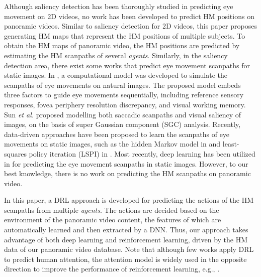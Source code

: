 \documentclass[10pt,journal,compsoc]{IEEEtran}
\begin{document}
Although saliency detection has been thoroughly studied in predicting eye movement on 2D videos, no work has been developed to predict HM positions on panoramic videos.
Similar to saliency detection for 2D videos, this paper proposes generating HM maps that represent the HM positions of multiple subjects.
To obtain the HM maps of panoramic video, the HM positions are predicted by estimating the HM scanpaths of several \textit{agents}. Similarly, in the saliency detection area, there exist some works \cite{Wang2011, Sun12, Liu_2013_ICCV, Jiang2016, Assens_2017_ICCV, Shao2017} that predict eye movement scanpaths for static images.
In \cite{Wang2011}, a computational model was developed to simulate the scanpaths of eye movements on natural images. The proposed model embeds three factors to guide eye movements sequentially, including reference sensory responses, fovea periphery resolution discrepancy, and visual working memory. Sun \textit{et al.} \cite{Sun12} proposed modelling both saccadic scanpaths and visual saliency of images, on the basis of super Gaussian component (SGC) analysis. Recently, data-driven approaches have been proposed to learn the scanpaths of eye movements on static images, such as the hidden Markov model in \cite{Liu_2013_ICCV} and least-squares policy iteration (LSPI) in \cite{Jiang2016}.
Most recently, deep learning has been utilized in \cite{Assens_2017_ICCV, Shao2017} for predicting the eye movement scanpaths in static images.
However, to our best knowledge, there is no work on predicting the HM scanpaths on panoramic video.


In this paper, a DRL approach is developed for predicting the actions of the HM scanpaths from multiple \textit{agents}.
The actions are decided based on the environment of the panoramic video content, the features of which are automatically learned and then extracted by a DNN. Thus, our approach takes advantage
of both deep learning and reinforcement learning, driven by the HM data of our panoramic video database. Note that although few works apply DRL to predict human attention, the attention model is widely used in the opposite direction to improve the performance of reinforcement learning, e.g., \cite{minut2001reinforcement, mnih2014recurrent, jaderberg2016reinforcement, wang2016dueling}.
\end{document}
